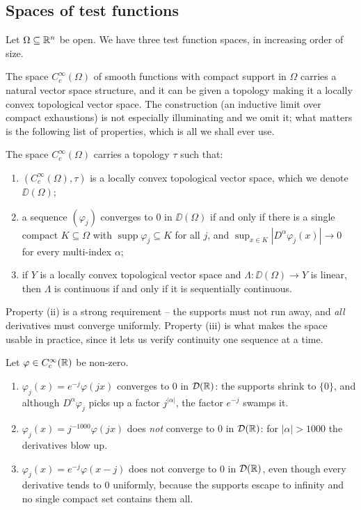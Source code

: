 \documentclass[a4paper]{scrartcl}
\DeclareMathOperator{\supp}{supp}
\begin{document}
\subsection{Spaces of test functions}

Let $\Omega \subseteq \mathbb{R}^n$ be open. We have three test function spaces, in increasing order of size.

The space $C_c^\infty(\Omega)$ of smooth functions with compact support in $\Omega$ carries a natural vector space structure, and it can be given a topology making it a locally convex topological vector space. The construction (an inductive limit over compact exhaustions) is not especially illuminating and we omit it; what matters is the following list of properties, which is all we shall ever use.

\begin{theorem}\label{thm:Dtopology}
	The space $C_c^\infty(\Omega)$ carries a topology $\tau$ such that:
	\begin{enumerate}[label=(\roman*)]
		\item $(C_c^\infty(\Omega),\tau)$ is a locally convex topological vector space, which we denote $\DD(\Omega)$;
		\item a sequence $(\varphi_j)$ converges to $0$ in $\DD(\Omega)$ if and only if there is a single compact $K \subseteq \Omega$ with $\supp \varphi_j \subseteq K$ for all $j$, and $\sup_{x\in K}|D^\alpha \varphi_j(x)|\to 0$ for every multi-index $\alpha$;
		\item if $Y$ is a locally convex topological vector space and $\Lambda : \DD(\Omega)\to Y$ is linear, then $\Lambda$ is continuous if and only if it is sequentially continuous.
	\end{enumerate}
\end{theorem}

Property (ii) is a strong requirement -- the supports must not run away, and \emph{all} derivatives must converge uniformly. Property (iii) is what makes the space usable in practice, since it lets us verify continuity one sequence at a time.

\begin{example}
	Let $\varphi \in C_c^\infty(\mathbb{R})$ be non-zero.
	\begin{enumerate}[label=(\alph*)]
		\item $\varphi_j(x) = e^{-j}\varphi(jx)$ converges to $0$ in $\mathcal{D}(\mathbb{R})$: the supports shrink to $\{0\}$, and although $D^\alpha\varphi_j$ picks up a factor $j^{|\alpha|}$, the factor $e^{-j}$ swamps it.
		\item $\varphi_j(x) = j^{-1000}\varphi(jx)$ does \emph{not} converge to $0$ in $\mathcal{D}(\mathbb{R})$: for $|\alpha|>1000$ the derivatives blow up.
		\item $\varphi_j(x) = e^{-j}\varphi(x-j)$ does not converge to $0$ in $\mathcal{D}(\mathbb{R})$, even though every derivative tends to $0$ uniformly, because the supports escape to infinity and no single compact set contains them all.
	\end{enumerate}
\end{example}
\end{document}
